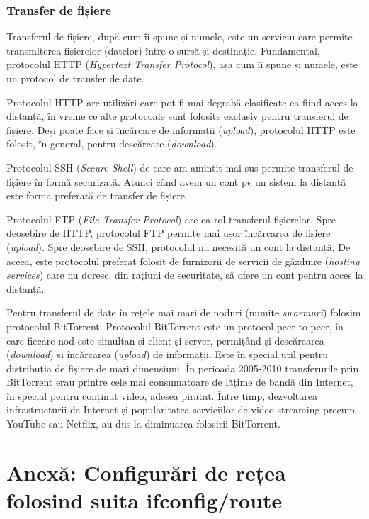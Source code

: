 \subsubsection{Transfer de fișiere}
\label{sec:net:apps:other:file-transfer}

Transferul de fișiere, după cum îi spune și numele, este un serviciu care permite transmiterea fișierelor (datelor) între o sursă și destinație.
Fundamental, protocolul HTTP (\textit{Hypertext Transfer Protocol}), așa cum îi spune și numele, este un protocol de transfer de date.

Protocolul HTTP are utilizări care pot fi mai degrabă clasificate ca fiind acces la distanță, în vreme ce alte protocoale sunt folosite exclusiv pentru transferul de fișiere.
Deși poate face și încărcare de informații (\textit{upload}), protocolul HTTP este folosit, în general, pentru descărcare (\textit{download}).

Protocolul SSH (\textit{Secure Shell}) de care am amintit mai sus permite transferul de fișiere în formă securizată.
Atunci când avem un cont pe un sistem la distanță este forma preferată de transfer de fișiere.

Protocolul FTP (\textit{File Transfer Protocol}) are ca rol transferul fișierelor.
Spre deosebire de HTTP, protocolul FTP permite mai ușor încărcarea de fișiere (\textit{upload}).
Spre deosebire de SSH, protocolul nu necesită un cont la distanță.
De aceea, este protocolul preferat folosit de furnizorii de servicii de găzduire (\textit{hosting services}) care nu doresc, din rațiuni de securitate, să ofere un cont pentru acces la distanță.

Pentru transferul de date în rețele mai mari de noduri (numite \textit{swarmuri}) folosim protocolul BitTorrent.
Protocolul BitTorrent este un protocol peer-to-peer, în care fiecare nod este simultan și client și server, permițând și descărcarea (\textit{download}) și încărcarea (\textit{upload}) de informații.
Este în special util pentru distribuția de fișiere de mari dimensiuni.
În perioada 2005-2010 transferurile prin BitTorrent erau printre cele mai consumatoare de lățime de bandă din Internet, în special pentru conținut video, adesea piratat.
Între timp, dezvoltarea infrastructurii de Internet și popularitatea serviciilor de video streaming precum YouTube sau Netflix, au dus la diminuarea folosirii BitTorrent.

\section{Anexă: Configurări de rețea folosind suita ifconfig/route}
\label{sec:net:config-ifconfig}


